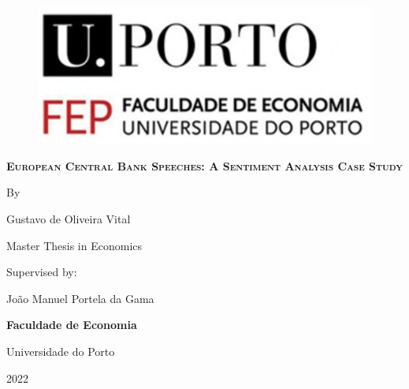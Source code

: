 \date{}
\begin{titlepage}
\begin{center}

\begin{figure}[ht!]
    \centering
    \includegraphics[scale=0.5]{images/FEP.PNG}
\end{figure}

\vspace*{0.7in}
{\LARGE \textbf{ {\scshape European Central Bank Speeches: A Sentiment Analysis Case Study}}}
\par
\vspace{0.4in}
{\large By}
\par
\vspace{0.4in}
{\large Gustavo de Oliveira Vital}
\par
\vspace{1in}
{\large Master Thesis in Economics}
\par
\vspace{0.8in}
\end{center}
{\large Supervised by:} \\ 
\par
{\large João Manuel Portela da Gama}
\par
\vspace{0.10in}
\vspace{1in}
\begin{center}
{\large \textbf{Faculdade de Economia}}
\par
\vspace{0.10in}
{\large Universidade do Porto}
\par
\vspace{0.2in}
{\large 2022}
\end{center}
\end{titlepage}


